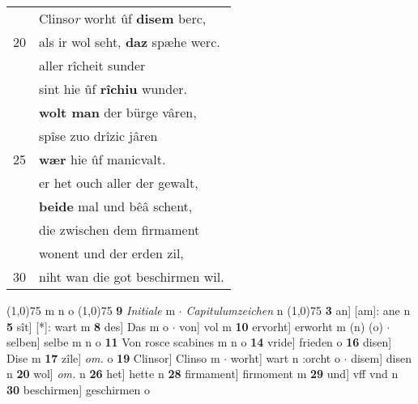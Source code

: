 \documentclass[8pt,a4paper,notitlepage]{article}
\begin{document}
\begin{table}[ht]
\begin{minipage}[t]{0.5\linewidth}
\begin{tabular}{rl}
 & Clinso\textit{r} worht ûf \textbf{disem} berc,\\ 
20 & als ir wol seht, \textbf{daz} spæhe werc.\\ 
 & aller rîcheit sunder\\ 
 & sint hie ûf \textbf{rîchiu} wunder.\\ 
 & \textbf{wolt man} der bürge vâren,\\ 
 & spîse zuo drîzic jâren\\ 
25 & \textbf{wær} hie ûf manicvalt.\\ 
 & er het ouch aller der gewalt,\\ 
 & \textbf{beide} mal und bêâ schent,\\ 
 & die zwischen dem firmament\\ 
 & wonent und der erden zil,\\ 
30 & niht wan die got beschirmen wil.\\ 
\end{tabular}
\scriptsize
\line(1,0){75} \newline
m n o \newline
\line(1,0){75} \newline
\textbf{9} \textit{Initiale} m   $\cdot$ \textit{Capitulumzeichen} n  \newline
\line(1,0){75} \newline
\textbf{3} an] [am]: ane n \textbf{5} sît] [*]: wart m \textbf{8} des] Das m o  $\cdot$ von] vol m \textbf{10} ervorht] erworht m (n) (o)  $\cdot$ selben] selbe m n o \textbf{11} Von rosce scabines m n o \textbf{14} vride] frieden o \textbf{16} disen] Dise m \textbf{17} zîle] \textit{om.} o \textbf{19} Clinsor] Clinso m  $\cdot$ worht] wart n :orcht o  $\cdot$ disem] disen n \textbf{20} wol] \textit{om.} n \textbf{26} het] hette n \textbf{28} firmament] firmoment m \textbf{29} und] vff vnd n \textbf{30} beschirmen] geschirmen o \newline
\end{minipage}
\end{table}
\newpage
\end{document}
